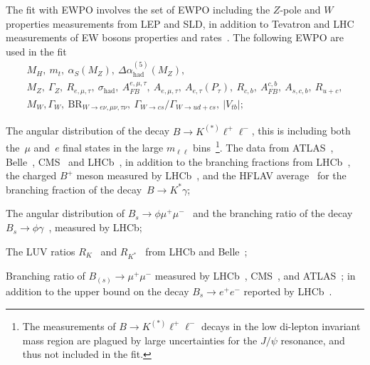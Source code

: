 \begin{itemize}
	\setlength\itemsep{0em}
	{\item The fit with EWPO involves the set of EWPO including the $Z$-pole and $W$ properties measurements from LEP and SLD, in addition to  Tevatron and LHC measurements of  EW bosons properties and rates~\cite{ALEPH:2005ab,Abe:2000uc,Group:2012gb,Schael:2013ita,Aaboud:2017svj,Khachatryan:2014iya,Abazov:2011ws}. The following EWPO are used in the fit 
		\begin{gather*}
			M_H,~m_t,~\alpha_S(M_Z),~\Delta \alpha_{\mathrm{had}}^{(5)}(M_Z),\\
			M_{Z},~\Gamma_{Z},~R_{e,\mu,\tau},~\sigma_{\mathrm{had}}, ~A^{e,\mu,\tau}_{FB},~A_{e,\mu,\tau},~A_{e,\tau}(P_\tau),~ R_{c,b},~A^{c,b}_{FB},~A_{s,c,b},~R_{u+c}, \\
			M_{W},\Gamma_{W},~\mathrm{BR}_{W\to e \nu,\mu \nu,\tau \nu},~\Gamma_{W\to cs}/\Gamma_{W\to ud+cs},~\left|V_{tb}\right|;
		\end{gather*}
	}
	\item The angular distribution of the decay $B\to K^{(*)}\ell^+\ell^-$, this is including both the~$\mu$ and~$e$ final states in the large $m_{\ell \ell}$ bins~\footnote{The measurements of  $B\to K^{(*)}\ell^+\ell^-$ decays in the low di-lepton invariant mass region are plagued by large uncertainties for the $J/\psi$ resonance, and thus not included in the fit.}.   The data from ATLAS~\cite{Aaboud:2018krd}, Belle~\cite{Wehle:2016yoi}, CMS~\cite{Khachatryan:2015isa,Sirunyan:2017dhj} and LHCb~\cite{Aaij:2015dea,Aaij:2020nrf}, in addition to the branching fractions from LHCb~\cite{Aaij:2016flj}, the charged $B^+$ meson measured by LHCb~\cite{Aaij:2014pli}, and the HFLAV average~\cite{Amhis:2019ckw} for the branching fraction of the decay~$B\to K^*\gamma$; 
	\item The angular distribution of $B_s\to \phi\mu^+\mu^-$~\cite{Aaij:2015esa} and the branching ratio of  the decay $B_s\to\phi\gamma$~\cite{Aaij:2012ita}, measured by LHCb;
	\item The LUV ratios $R_K$~\cite{Aaij:2019wad} and $R_{K^*}$~\cite{Aaij:2017vbb} from LHCb and Belle~\cite{Abdesselam:2019wac};
	\item Branching ratio of $B_{(s)}\to \mu^+\mu^-$ measured by LHCb~\cite{Aaij:2017vad}, CMS~\cite{Chatrchyan:2013bka}, and ATLAS~\cite{Aaboud:2018mst}; in addition to the upper bound on the decay $B_s\to e^+e^-$ reported by LHCb~\cite{Aaij:2020nol}. 
\end{itemize}
